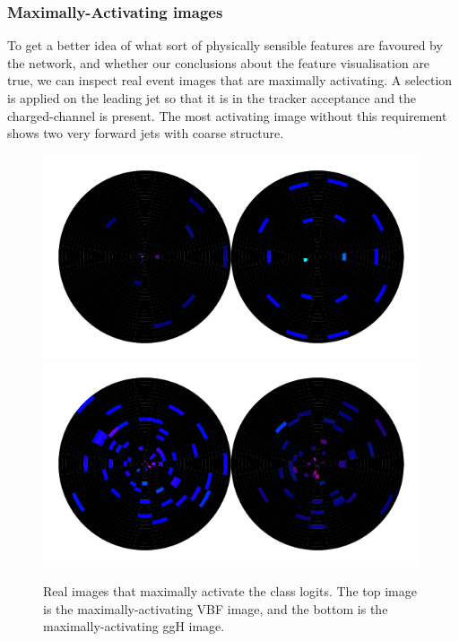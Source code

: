 \subsubsection{Maximally-Activating images}
To get a better idea of what sort of physically sensible features are favoured by the network, and whether our conclusions about the feature visualisation are true, we can inspect real event images that are maximally activating. 
A selection is applied on the leading jet so that it is in the tracker acceptance and the charged-\pt  channel is present. The most activating image without this requirement shows two very forward jets with coarse structure.
\begin{figure}[h!]
    \centering
    \includegraphics[width=0.99\textwidth]{figures/event_selection/max_img_vbf_tkr_cut_logits_normtype1.pdf}
    \includegraphics[width=0.99\textwidth]{figures/event_selection/max_img_ggh_tkr_cut_logits_normtype1.pdf}
    \caption{Real images that maximally activate the class logits. 
             The top image is the maximally-activating VBF image, and the bottom is the maximally-activating ggH image. }
    \label{fig:event_categorisation:maxact_vis_vbf_ggh}
\end{figure}

